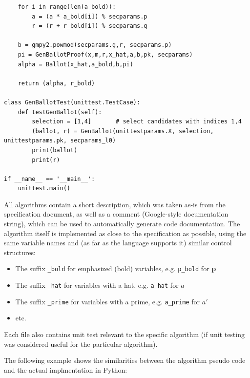 \documentclass[a4paper,12pt]{report}
\begin{document}
\begin{verbatim}
    for i in range(len(a_bold)):
        a = (a * a_bold[i]) % secparams.p
        r = (r + r_bold[i]) % secparams.q

    b = gmpy2.powmod(secparams.g,r, secparams.p)
    pi = GenBallotProof(x,m,r,x_hat,a,b,pk, secparams)
    alpha = Ballot(x_hat,a_bold,b,pi)

    return (alpha, r_bold)

class GenBallotTest(unittest.TestCase):
    def testGenBallot(self):
        selection = [1,4]       # select candidates with indices 1,4
        (ballot, r) = GenBallot(unittestparams.X, selection, unittestparams.pk, secparams_l0)
        print(ballot)
        print(r)

if __name__ == '__main__':
    unittest.main()
\end{verbatim}

All algorithms contain a short description, which was taken as-is from the specification document, as well as a comment (Google-style documentation string), which can be used to automatically generate code documentation. The algorithm itself is implemented as close to the specification as possible, using the same variable names and (as far as the language supports it) similar control structures:

\begin{itemize}
	\item The suffix \texttt{\_bold} for emphasized (bold) variables, e.g. \texttt{p\_bold} for \textbf{p}
	\item The suffix \texttt{\_hat} for variables with a hat, e.g. \texttt{a\_hat} for $\hat{a}$
	\item The suffix \texttt{\_prime} for variables with a prime, e.g. \texttt{a\_prime} for $a'$
	\item etc.
\end{itemize}

Each file also contains unit test relevant to the specific algorithm (if unit testing was considered useful for the particular algorithm).

The following example shows the similarities between the algorithm pseudo code and the actual implmentation in Python:
\end{document}
